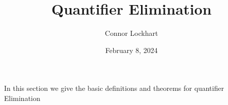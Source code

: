 \documentclass[a4paper]{article}
\title{Quantifier Elimination}
\date{February 8, 2024}
\author{Connor Lockhart}
\begin{document}
\maketitle
\par{In this section we give the basic definitions and theorems for quantifier Elimination}
\printbibliography
\end{document}
